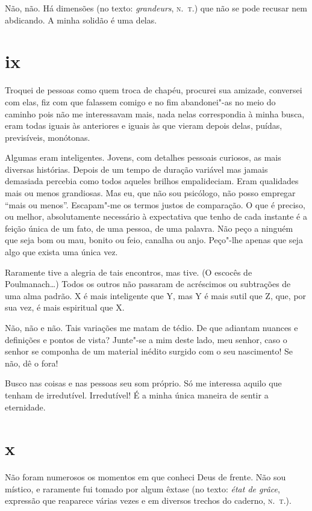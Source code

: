 Não, não. Há dimensões (no texto: \emph{grandeurs}, \textsc{n.~t.}) que não se
pode recusar nem abdicando. A minha solidão é uma delas.

\section{ix}

Troquei de pessoas como quem troca de chapéu, procurei sua amizade,
conversei com elas, fiz com que falassem comigo e no fim abandonei"-as
no meio do caminho pois não me interessavam mais, nada nelas
correspondia à minha busca, eram todas iguais às anteriores e
iguais às que vieram depois delas, puídas, previsíveis, monótonas.

Algumas eram inteligentes. Jovens, com detalhes pessoais curiosos,
as mais diversas histórias. Depois de um tempo de duração variável
mas jamais demasiada percebia como todos aqueles brilhos
empalideciam. Eram qualidades mais ou menos grandiosas. Mas eu, que não
sou psicólogo, não posso empregar ``mais ou menos''. Escapam"-me os
termos justos de comparação. O que é preciso, ou melhor,
absolutamente necessário à expectativa que tenho de cada instante é a
feição única de um fato, de uma pessoa, de uma palavra. Não peço a
ninguém que seja bom ou mau, bonito ou feio, canalha ou anjo. Peço"-lhe
apenas que seja algo que exista uma única vez.

Raramente tive a alegria de tais encontros, mas tive. (O escocês de
Poulmanach\ldots{}) Todos os outros não passaram de acréscimos ou
subtrações de uma alma padrão. X é mais inteligente que Y, mas Y é mais
sutil que Z, que, por sua vez, é mais espiritual que X.

Não, não e não. Tais variações me matam de tédio. De que adiantam
nuances e definições e pontos de vista? Junte"-se a mim deste lado, meu
senhor, caso o senhor se componha de um material inédito surgido com o
seu nascimento! Se não, dê o fora!

Busco nas coisas e nas pessoas seu som próprio. Só me interessa aquilo
que tenham de irredutível. Irredutível! É a minha única maneira de
sentir a eternidade.

\section{x}

Não foram numerosos os momentos em que conheci Deus de frente. Não sou
místico, e raramente fui tomado por algum êxtase (no texto: \emph{état
de grâce}, expressão que reaparece várias vezes e em diversos trechos do
caderno, \textsc{n.~t.}).

